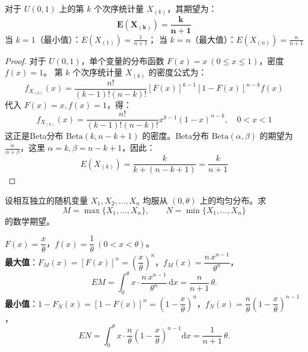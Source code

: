 ﻿\documentclass[lang=cn,11pt]{elegantbook}
\begin{document}
\begin{proposition}[均匀分布次序统计量的通用结论]\label{prop:order-stat-uniform}
对于 \( U(0,1) \) 上的第 \( k \) 个次序统计量 \( X_{(k)} \)，其期望为：
\[
\boldsymbol{E(X_{(k)}) = \frac{k}{n+1}}
\]
当 \( k=1 \)（最小值）：\( E(X_{(1)}) = \frac{1}{n+1} \)； 当 \( k=n \)（最大值）：\( E(X_{(n)}) = \frac{n}{n+1} \)
\end{proposition}
\begin{proof}
对于 \( U(0,1) \)，单个变量的分布函数 \( F(x)=x \ (0\leq x\leq1) \)，密度 \( f(x)=1 \)。
第 \( k \) 个次序统计量 \( X_{(k)} \) 的密度公式为：
\[
f_{X_{(k)}}(x) = \frac{n!}{(k-1)!(n-k)!} [F(x)]^{k-1} [1-F(x)]^{n-k} f(x)
\]
代入 \( F(x)=x, f(x)=1 \)，得：
\[
f_{X_{(k)}}(x) = \frac{n!}{(k-1)!(n-k)!} x^{k-1} (1-x)^{n-k}, \quad 0<x<1
\]
这正是Beta分布 \( \text{Beta}(k, n-k+1) \) 的密度。Beta分布 \( \text{Beta}(\alpha,\beta) \) 的期望为 \( \frac{\alpha}{\alpha+\beta} \)，这里 \( \alpha=k, \beta=n-k+1 \)，因此：
\[
E(X_{(k)}) = \frac{k}{k + (n-k+1)} = \frac{k}{n+1}
\]
\end{proof}

\begin{exercise}\label{exer:4-order-stat}
设相互独立的随机变量 \(X_1, X_2, \dots, X_n\) 均服从 \((0, \theta)\) 上的均匀分布。求
\[
M = \max\{X_1, \dots, X_n\},\qquad
N = \min\{X_1, \dots, X_n\}
\]
的数学期望。
\end{exercise}
\begin{solution}
\(F(x) = \dfrac{x}{\theta}\)，\(f(x) = \dfrac{1}{\theta}\ (0 < x < \theta)\)。\\
\textbf{最大值}：\(F_M(x) = [F(x)]^n = \left(\dfrac{x}{\theta}\right)^n\)，\(f_M(x) = \dfrac{n\,x^{n-1}}{\theta^n}\)，
\[
EM = \int_0^\theta x \cdot \frac{n\,x^{n-1}}{\theta^n}\,\mathrm{d}x = \frac{n}{n+1}\,\theta.
\]
\textbf{最小值}：\(1 - F_N(x) = [1 - F(x)]^n = \left(1 - \dfrac{x}{\theta}\right)^n\)，\(f_N(x) = \dfrac{n}{\theta}\!\left(1 - \dfrac{x}{\theta}\right)^{n-1}\)，
\[
EN = \int_0^\theta x \cdot \frac{n}{\theta}\!\left(1 - \frac{x}{\theta}\right)^{n-1}\mathrm{d}x = \frac{1}{n+1}\,\theta.
\]
\end{solution}
\end{document}
